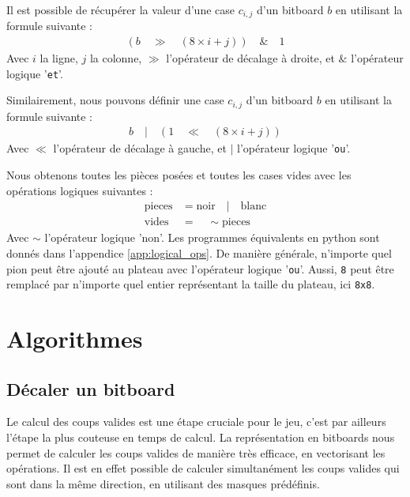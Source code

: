 Il est possible de récupérer la valeur d'une case $c_{i,j}$ d'un bitboard $b$ en utilisant la formule suivante : 
\begin{align*}
    (b\quad \gg\quad (8\times i+j))\quad \&\quad 1
\end{align*}
Avec $i$ la ligne, $j$ la colonne, $\gg$ l'opérateur de décalage à droite, et $\&$ l'opérateur logique '\texttt{et}'.

Similairement, nous pouvons définir une case $c_{i,j}$ d'un bitboard $b$ en utilisant la formule suivante :
\begin{align*}
    b\quad |\quad (1\quad \ll\quad (8\times i+j))
\end{align*}
Avec $\ll$ l'opérateur de décalage à gauche, et $|$ l'opérateur logique '\texttt{ou}'.

Nous obtenons toutes les pièces posées et toutes les cases vides avec les opérations logiques suivantes :
\begin{align*}
    \text{pieces} &= \text{noir} \quad | \quad \text{blanc} \\
    \text{vides} &= \quad\sim\text{pieces}
\end{align*}
Avec $\sim$ l'opérateur logique 'non'. Les programmes équivalents en python sont donnés dans l'appendice \ref{app:logical_ops}. De manière générale, n'importe quel pion peut être ajouté au plateau avec l'opérateur logique '\texttt{ou}'. Aussi, \texttt{8} peut être remplacé par n'importe quel entier représentant la taille du plateau, ici \texttt{8x8}.


\section{Algorithmes}
\label{sec:algo}

\subsection{Décaler un bitboard}
\label{subsec:shift}
Le calcul des coups valides est une étape cruciale pour le jeu, c'est par ailleurs l'étape la plus couteuse en temps de calcul. La représentation en bitboards nous permet de calculer les coups valides de manière très efficace, en vectorisant les opérations. Il est en effet possible de calculer simultanément les coups valides qui sont dans la même direction, en utilisant des masques prédéfinis. 

